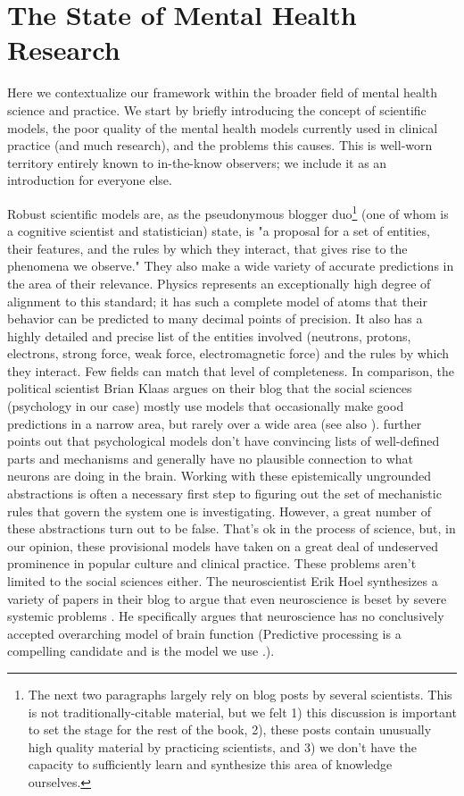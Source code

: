 \documentclass[12pt,letterpaper]{book}
\begin{document}
\section{The State of Mental Health Research}
Here we contextualize our framework within the broader field of mental health science and practice. We start by briefly introducing the concept of scientific models, the poor quality of the mental health models currently used in clinical practice (and much research), and the problems this causes. This is well-worn territory entirely known to in-the-know observers; we include it as an introduction for everyone else.

Robust scientific models are, as the pseudonymous blogger duo\footnote{The next two paragraphs largely rely on blog posts by several scientists. This is not traditionally-citable material, but we felt 1) this discussion is important to set the stage for the rest of the book, 2), these posts contain unusually high quality material by practicing scientists, and 3) we don't have the capacity to sufficiently learn and synthesize this area of knowledge ourselves.} \textcite{mechanisticModels} (one of whom is a cognitive scientist and statistician) state, is "a proposal for a set of entities, their features, and the rules by which they interact, that gives rise to the phenomena we observe." They also make a wide variety of accurate predictions in the area of their relevance. Physics represents an exceptionally high degree of alignment to this standard; it has such a complete model of atoms that their behavior can be predicted to many decimal points of precision. It also has a highly detailed and precise list of the entities involved (neutrons, protons, electrons, strong force, weak force, electromagnetic force) and the rules by which they interact. Few fields can match that level of completeness. In comparison, the political scientist Brian Klaas argues on their blog that the social sciences (psychology in our case) mostly use models that occasionally make good predictions in a narrow area, but rarely over a wide area \cite{zombieSocialScience} (see also \textcite{evidenceBasedPolicy}). \textcite{mechanisticModels} further points out that psychological models don't have convincing lists of well-defined parts and mechanisms and generally have no plausible connection to what neurons are doing in the brain. Working with these epistemically ungrounded abstractions is often a necessary first step to figuring out the set of mechanistic rules that govern the system one is investigating. However, a great number of these abstractions turn out to be false. That’s ok in the process of science, but, in our opinion, these provisional models have taken on a great deal of undeserved prominence in popular culture and clinical practice. These problems aren't limited to the social sciences either. The neuroscientist Erik Hoel synthesizes a variety of papers in their blog to argue that even neuroscience is beset by severe systemic problems \cite{hoelNeuroscience}. He specifically argues that neuroscience has no conclusively accepted overarching model of brain function (Predictive processing is a compelling candidate and is the model we use \cite{clark2015surfing}.).
\end{document}
